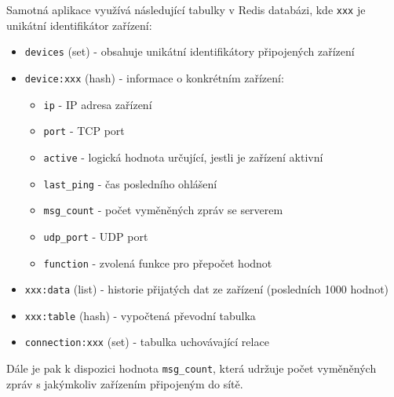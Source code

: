Samotná aplikace využívá následující tabulky v Redis databázi, kde \texttt{xxx} je unikátní identifikátor zařízení: 

\begin{itemize}
\itemsep0em
\item \texttt{devices} (set) - obsahuje unikátní identifikátory připojených zařízení
\item \texttt{device:xxx} (hash) - informace o konkrétním zařízení:
	\begin{itemize}
	\itemsep0em
		\item \texttt{ip} - IP adresa zařízení
		\item \texttt{port} - TCP port
		\item \texttt{active} - logická hodnota určující, jestli je zařízení aktivní
		\item \texttt{last\_ping} - čas posledního ohlášení
		\item \texttt{msg\_count} - počet vyměněných zpráv se serverem
		\item \texttt{udp\_port} - UDP port
		\item \texttt{function} - zvolená funkce pro přepočet hodnot
	\end{itemize}
\item \texttt{xxx:data} (list) - historie přijatých dat ze zařízení (posledních 1000 hodnot)
\item \texttt{xxx:table} (hash) - vypočtená převodní tabulka
\item \texttt{connection:xxx} (set) - tabulka uchovávající relace
\end{itemize}

Dále je pak k dispozici hodnota \texttt{msg\_count}, která udržuje počet vy\-mě\-ně\-ných zpráv s jakýmkoliv zařízením připojeným do sítě.

